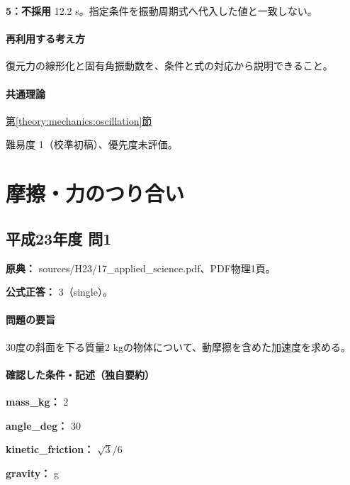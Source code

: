 \noindent\textbf{5：不採用} 12.2 s。指定条件を振動周期式へ代入した値と一致しない。\par

\paragraph{再利用する考え方} 復元力の線形化と固有角振動数を、条件と式の対応から説明できること。

\paragraph{共通理論} \hyperref[theory:mechanics:oscillation]{第\ref*{theory:mechanics:oscillation}節}

\par 難易度 1（校準初稿）、優先度未評価。

\section{摩擦・力のつり合い}

\subsection{平成23年度 問1}
\label{q:h23-reg-applied-01}

\noindent\textbf{原典：} sources/H23/17\_applied\_science.pdf、PDF物理1頁。

\textbf{公式正答：} 3（single）。

\paragraph{問題の要旨} 30度の斜面を下る質量2 kgの物体について、動摩擦を含めた加速度を求める。

\paragraph{確認した条件・記述（独自要約）}\mbox{}\par

\noindent\textbf{mass\_kg：} 2\par

\noindent\textbf{angle\_deg：} 30\par

\noindent\textbf{kinetic\_friction：} \(\sqrt{3}/6\)\par

\noindent\textbf{gravity：} g\par

